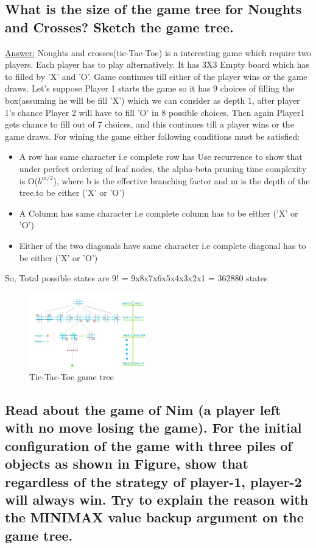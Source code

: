 \documentclass[15pt,journal]{IEEEtran}
\begin{document}
\subsection{What is the size of the game tree for Noughts and Crosses? Sketch the game tree.}
\underline{Answer:} 
Noughts and crosses(tic-Tac-Toe) is a interesting game which require two players. Each player has to play alternatively. It has 3X3 Empty board which has to filled by 'X' and 'O'. Game continues till either of the player wins or the game draws. Let's suppose Player 1 starts the game so it has 9 choices of filling the box(assuming he will be fill 'X') which we can consider as depth 1, after player 1's chance Player 2 will have to fill 'O' in 8 possible choices. Then again Player1 gets chance to fill out of 7 choices, and this continues till a player wins or the game draws. For wining the game either following conditions must be satisfied:
\begin{itemize}
    \item A row has same character i.e complete row has Use recurrence to show that under perfect ordering of leaf nodes, the alpha-beta pruning time complexity is O($b^{m/2}$), where b is the effective branching factor and m is the depth of the tree.to be either ('X' or 'O')
    \item A Column has same character i.e complete column has to be either ('X' or 'O')
    \item Either of the two diagonals have same character i.e complete diagonal has to be either ('X' or 'O')
\end{itemize}
So, Total possible states are 9! = 9x8x7x6x5x4x3x2x1 = 362880 states

\begin{figure}[H]%
\begin {center}
\includegraphics[width=0.45\textwidth]{images/minimax.png}
\caption{Tic-Tac-Toe game tree} 
\label{fig:ecg}
\end {center}
\end{figure}    
    

\subsection{Read about the game of Nim (a player left with no move losing the game). For the initial configuration of the game with three piles of objects as shown in Figure, show that regardless of the strategy of player-1, player-2 will always win. Try to explain the reason with the MINIMAX value backup argument on the game tree.}
\end{document}
